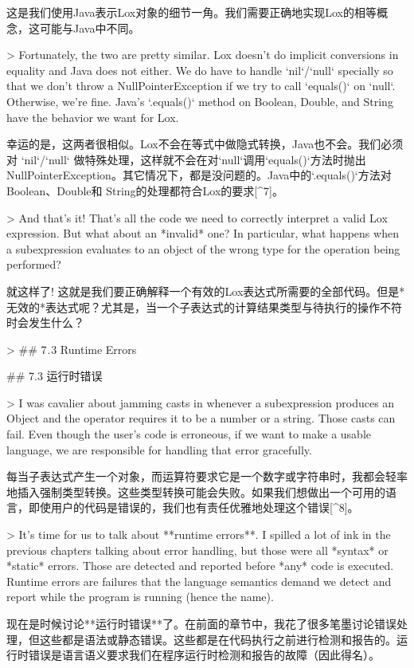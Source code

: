 \documentclass[cn,11pt,chinese]{elegantbook}
\begin{document}
{{{{这是我们使用Java表示Lox对象的细节一角。我们需要正确地实现Lox的相等概念，这可能与Java中不同。

> Fortunately, the two are pretty similar. Lox doesn’t do implicit conversions in equality and Java does not either. We do have to handle `nil`/`null` specially so that we don’t throw a NullPointerException if we try to call `equals()` on `null`. Otherwise, we’re fine. Java’s `.equals()` method on Boolean, Double, and String have the behavior we want for Lox.

幸运的是，这两者很相似。Lox不会在等式中做隐式转换，Java也不会。我们必须对 `nil`/`null` 做特殊处理，这样就不会在对`null`调用`equals()`方法时抛出NullPointerException。其它情况下，都是没问题的。Java中的`.equals()`方法对Boolean、Double和 String的处理都符合Lox的要求[^7]。

> And that’s it! That’s all the code we need to correctly interpret a valid Lox expression. But what about an *invalid* one? In particular, what happens when a subexpression evaluates to an object of the wrong type for the operation being performed?

就这样了! 这就是我们要正确解释一个有效的Lox表达式所需要的全部代码。但是*无效的*表达式呢？尤其是，当一个子表达式的计算结果类型与待执行的操作不符时会发生什么？

> ## 7 . 3 Runtime Errors

## 7.3 运行时错误

> I was cavalier about jamming casts in whenever a subexpression produces an Object and the operator requires it to be a number or a string. Those casts can fail. Even though the user’s code is erroneous, if we want to make a usable language, we are responsible for handling that error gracefully.

每当子表达式产生一个对象，而运算符要求它是一个数字或字符串时，我都会轻率地插入强制类型转换。这些类型转换可能会失败。如果我们想做出一个可用的语言，即使用户的代码是错误的，我们也有责任优雅地处理这个错误[^8]。

> It’s time for us to talk about **runtime errors**. I spilled a lot of ink in the previous chapters talking about error handling, but those were all *syntax* or *static* errors. Those are detected and reported before *any* code is executed. Runtime errors are failures that the language semantics demand we detect and report while the program is running (hence the name).

现在是时候讨论**运行时错误**了。在前面的章节中，我花了很多笔墨讨论错误处理，但这些都是语法或静态错误。这些都是在代码执行之前进行检测和报告的。运行时错误是语言语义要求我们在程序运行时检测和报告的故障（因此得名）。

}}}}
\end{document}
